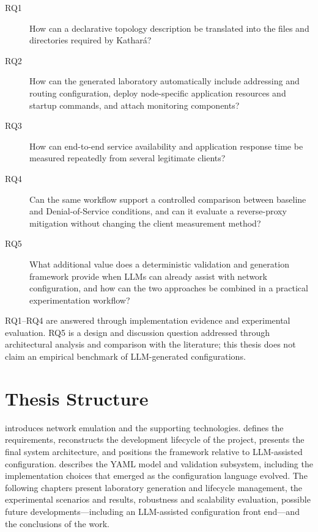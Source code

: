 \documentclass[a4paper,10pt,titlepage,twoside]{book}
\numberwithin{equation}{chapter}
\theoremstyle{plain}
\theoremstyle{definition}
\begin{document}
\begin{description}
    \item[RQ1] How can a declarative topology description be translated into
    the files and directories required by Kathar\'a?

    \item[RQ2] How can the generated laboratory automatically include
    addressing and routing configuration, deploy node-specific application
    resources and startup commands, and attach monitoring components?

    \item[RQ3] How can end-to-end service availability and application
    response time be measured repeatedly from several legitimate clients?

    \item[RQ4] Can the same workflow support a controlled comparison between
    baseline and Denial-of-Service conditions, and can it evaluate a
    reverse-proxy mitigation without changing the client measurement method?

    \item[RQ5] What additional value does a deterministic validation and
    generation framework provide when LLMs can already assist with network
    configuration, and how can the two approaches be combined in a practical
    experimentation workflow?
\end{description}

RQ1--RQ4 are answered through implementation evidence and experimental
evaluation. RQ5 is a design and discussion question addressed through
architectural analysis and comparison with the literature; this thesis does
not claim an empirical benchmark of LLM-generated configurations.

\section*{Thesis Structure}
{}

 introduces network emulation and the supporting
technologies.  defines the requirements,
reconstructs the development lifecycle of the project, presents the final
system architecture, and positions the framework relative to LLM-assisted
configuration.  describes the YAML model
and validation subsystem, including the implementation choices that emerged as
the configuration language evolved. The following chapters present laboratory
generation and lifecycle management, the experimental scenarios and results,
robustness and scalability evaluation, possible future developments---including
an LLM-assisted configuration front end---and the conclusions of the work.
\end{document}
